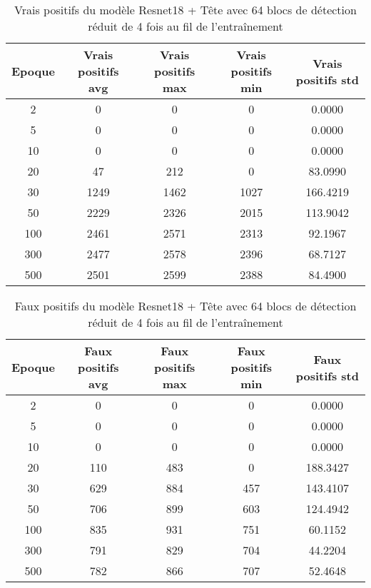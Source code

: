 \begin{table}[!ht]
    \caption{Vrais positifs du modèle Resnet18 + Tête avec 64 blocs de détection réduit de 4 fois au fil de l'entraînement}
    \label{tab:resnet18+head_64n_true_positive_reduced_4x_precision}
    \centering
    \begin{tabular}{ |c||c|c|c|c|  }
        \hline
        \rowcolor{gray!50}
        Epoque & Vrais positifs avg & Vrais positifs max & Vrais positifs min & Vrais positifs std\\
        \hline
        2 & 0 & 0 & 0 & 0.0000\\
        5 & 0 & 0 & 0 & 0.0000\\
        10 & 0 & 0 & 0 & 0.0000\\
        20 & 47 & 212 & 0 & 83.0990\\
        30 & 1249 & 1462 & 1027 & 166.4219\\
        50 & 2229 & 2326 & 2015 & 113.9042\\
        100 & 2461 & 2571 & 2313 & 92.1967\\
        300 & 2477 & 2578 & 2396 & 68.7127\\
        500 & 2501 & 2599 & 2388 & 84.4900\\
        \hline
    \end{tabular}
\end{table}

\begin{table}[!ht]
    \caption{Faux positifs du modèle Resnet18 + Tête avec 64 blocs de détection réduit de 4 fois au fil de l'entraînement}
    \label{tab:resnet18+head_64n_false_positive_reduced_4x_precision}
    \centering
    \begin{tabular}{ |c||c|c|c|c|  }
        \hline
        \rowcolor{gray!50}
        Epoque & Faux positifs avg & Faux positifs max & Faux positifs min & Faux positifs std\\
        \hline
        2 & 0 & 0 & 0 & 0.0000\\
        5 & 0 & 0 & 0 & 0.0000\\
        10 & 0 & 0 & 0 & 0.0000\\
        20 & 110 & 483 & 0 & 188.3427\\
        30 & 629 & 884 & 457 & 143.4107\\
        50 & 706 & 899 & 603 & 124.4942\\
        100 & 835 & 931 & 751 & 60.1152\\
        300 & 791 & 829 & 704 & 44.2204\\
        500 & 782 & 866 & 707 & 52.4648\\
        \hline
    \end{tabular}
\end{table}

